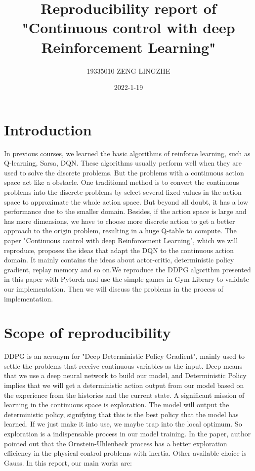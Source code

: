 \documentclass[a4paper,12pt,oneside,article]{memoir}
\begin{document}

\title {Reproducibility report of "Continuous control with deep Reinforcement Learning"}
\author{19335010   ZENG LINGZHE}
\date{2022-1-19}
\maketitle\thispagestyle{mypagestyle}

\chapter{Introduction}
In previous courses, we learned the basic algorithms of reinforce learning, such as Q-learning, Sarsa, DQN. These algorithms usually perform well when they are used to solve the discrete problems. But the problems with a continuous action space act like a obstacle. One traditional method is to convert the continuous problems into the discrete problems by select several fixed values in the action space to approximate the whole action space. But beyond all doubt, it has a low performance due to the smaller domain. Besides, if the action space is large and has more dimensions, we have to choose more discrete action to get a better approach to the origin problem, resulting in a huge Q-table to compute. The paper "Continuous control with deep Reinforcement Learning", which we will reproduce, proposes the ideas that adapt the DQN to the continuous action domain. It mainly contains the ideas about actor-critic, deterministic policy gradient, replay memory and so on.We reproduce the DDPG algorithm presented in this paper with Pytorch and use the simple games in Gym Library to validate our implementation. Then we will discuss the problems in the process of implementation.

\chapter{Scope of reproducibility}
DDPG is an acronym for "Deep Deterministic Policy Gradient", mainly used to settle the problems that receive continuous variables as the input. Deep means that we use a deep neural network to build our model, and Deterministic Policy implies that we will get a deterministic action output from our model based on the experience from the histories and the current state. A significant mission of learning in the continuous space is exploration. The model will output the deterministic policy, signifying that this is the best policy that the model has learned. If we just make it into use, we maybe trap into the local optimum. So exploration is a indispensable process in our model training. In the paper, author pointed out that the Ornstein-Uhlenbeck process has a better exploration efficiency in the physical control problems with inertia. Other available choice is Gauss. In this report, our main works are:
\end{document}
